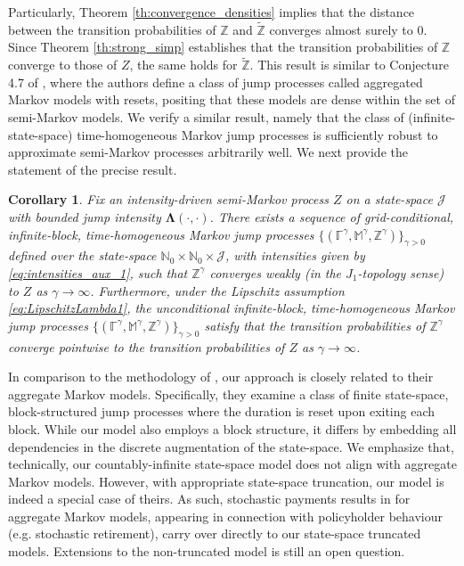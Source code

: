 \documentclass[11pt,leqno]{amsart}
\numberwithin{table}{section}
\numberwithin{figure}{section}
\numberwithin{equation}{section}
\newcommand{\1}{{\mathds{1}}}
\newcommand{\0}{\mat{0}}
\newtheorem{corollary}[lemma]{Corollary}
\newcommand{\ap}[1]{\mathbb{#1}}
\newcommand{\tld}[1]{\widetilde{#1}}
\newcommand{\apt}[1]{\tld{\mathbb{#1}}}
\begin{document}
{ Particularly, Theorem \ref{th:convergence_densities} implies that the distance between the transition probabilities of $\ap{Z}$ and $\apt{Z}$ converges almost surely to $0$. Since Theorem \ref{th:strong_simp} establishes that the transition probabilities of $\ap{Z}$ converge to those of $Z$, the same holds for $\apt{Z}$. This result {is similar to} Conjecture 4.7 of \cite{ahmad2023aggregate}, where the authors define a class of jump processes called aggregated Markov models with resets, positing that these models are dense within the set of semi-Markov models. {We verify a similar result, namely that the class of (infinite-state-space) time-homogeneous Markov jump processes is sufficiently robust to approximate semi-Markov processes arbitrarily well. We next provide the statement of the precise result.}

{
\begin{corollary}
Fix an intensity-driven semi-Markov process \( Z \) on a state-space \(\mathcal{J}\) with bounded jump intensity \(\bm{\Lambda}(\cdot, \cdot)\). There exists a sequence of grid-conditional, infinite-block, time-homogeneous Markov jump processes \(\{(\ap{\Gamma}^\gamma, \ap{M}^\gamma, \ap{Z}^\gamma)\}_{\gamma > 0}\) defined over the state-space \(\mathbb{N}_0 \times \mathbb{N}_0 \times \mathcal{J}\), with intensities given by \eqref{eq:intensities_aux_1}, such that \(\ap{Z}^\gamma\) converges weakly (in the \( J_1 \)-topology sense) to \( Z \) as \(\gamma \to \infty\). Furthermore, under the Lipschitz assumption \eqref{eq:LipschitzLambda1}, the unconditional infinite-block, time-homogeneous Markov jump processes \(\{(\ap{\Gamma}^\gamma, \ap{M}^\gamma, \ap{Z}^\gamma)\}_{\gamma > 0}\) satisfy that the transition probabilities of \(\ap{Z}^\gamma\) converge pointwise to the transition probabilities of \( Z \) as \(\gamma \to \infty\).
\end{corollary}
}

{ In comparison to the methodology of \cite{ahmad2023aggregate}, our approach is closely related to their aggregate Markov models. Specifically, they examine a class of finite state-space, block-structured jump processes where the duration is reset upon exiting each block. While our model also employs a block structure, it differs by embedding all dependencies in the discrete augmentation of the state-space. We emphasize that, technically, our countably-infinite state-space model does not align with aggregate Markov models. However, with appropriate state-space truncation, our model is indeed a special case of theirs. As such, stochastic payments results in \cite{ahmad2023aggregate} for aggregate Markov models, appearing in connection with policyholder behaviour (e.g. stochastic retirement), carry over directly to our state-space truncated models. Extensions to the non-truncated model is still an open question.}

}
\end{document}
